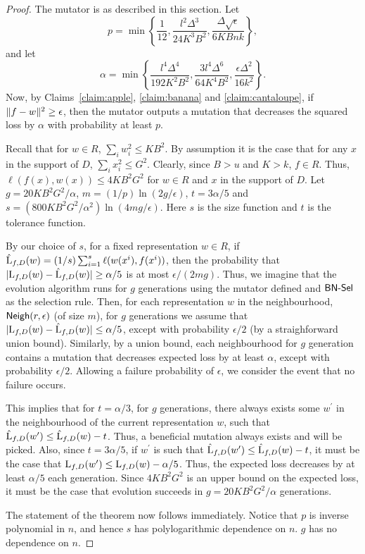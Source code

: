 \begin{proof}
The mutator is as described in this section. Let 
\[ p = \min\left\{\frac{1}{12}, \frac{l^2\Delta^3}{24K^3B^2}, \frac{\Delta
\sqrt{\epsilon}}{6KBnk}\right\},\] 
and let 
\[ \alpha = \min\left\{\frac{l^4 \Delta^4}{192 K^2B^2}, \frac{3 l^4
\Delta^6}{64K^4B^2}, \frac{\epsilon\Delta^2}{16k^2}\right\}.\] 
Now, by Claims~\ref{claim:apple}, \ref{claim:banana} and \ref{claim:cantaloupe},
if $\Vert f - w \Vert^2 \geq \epsilon$, then the mutator outputs a mutation that
decreases the squared loss by $\alpha$ with probability at least $p$.

Recall that for $w \in R$, $\sum_{i} w_i^2 \leq KB^2$. By assumption it is the
case that for any $x$ in the support of $D$, $\sum_{i} x_i^2 \leq G^2$. Clearly,
since $B > u$ and $K > k$, $f \in R$. Thus, $\ell(f(x), w(x)) \leq 4KB^2G^2$ for
$w \in R$ and $x$ in the support of $D$. Let $g = 20 KB^2G^2/\alpha$, $m =
(1/p)\ln(2g/\epsilon)$, $t = 3\alpha/5$  and $s = (800 KB^2G^2/\alpha^2)
\ln(4mg/\epsilon)$. Here $s$ is the size function and $t$ is the tolerance
function.

By our choice of $s$, for a fixed representation $w \in R$, if $\hat{\mathrm{L}}_{f,
D}(w) = (1/s) \sum_{i = 1}^s \ell(w(x^i), f(x^i))$, then the probability that
$|\mathrm{L}_{f, D}(w) - \hat{\mathrm{L}}_{f, D}(w)| \geq \alpha/5$ is at most
$\epsilon/(2mg)$. Thus, we imagine that the evolution algorithm runs for $g$
generations using the mutator defined and $\mathsf{BN\mbox{-}Sel}$ as the selection rule. Then,
for each representation $w$ in the neighbourhood, $\mathsf{Neigh}(r, \epsilon)$ (of size
$m$), for $g$ generations we assume that $|\mathrm{L}_{f, D}(w) - \hat{\mathrm{L}}_{f,
D}(w)| \leq \alpha/5$, except with probability $\epsilon/2$ (by a straighforward
union bound). Similarly, by a union bound, each neighbourhood for $g$ generation
contains a mutation that decreases expected loss by at least $\alpha$, except
with probability $\epsilon/2$. Allowing a failure probability of $\epsilon$, we
consider the event that no failure occurs. 

This implies that for $t = \alpha/3$, for $g$ generations, there always exists
some $w^\prime$ in the neighbourhood of the current representation $w$, such
that $\hat{\mathrm{L}}_{f, D}(w^\prime) \leq \hat{\mathrm{L}}_{f, D}(w) - t$. Thus, a
beneficial mutation always exists and will be picked. Also, since $t = 3
\alpha/5$, if $w^\prime$ is such that $\hat{\mathrm{L}}_{f, D}(w^\prime) \leq
\hat{\mathrm{L}}_{f, D}(w) - t$, it must be the case that $\mathrm{L}_{f, D}(w^\prime) \leq
\mathrm{L}_{f, D}(w) - \alpha/5$. Thus, the expected loss decreases by at least
$\alpha/5$ each generation. Since $4KB^2G^2$ is an upper bound on the expected
loss, it must be the case that evolution succeeds in $g = 20 KB^2G^2/\alpha$
generations.

The statement of the theorem now follows immediately.
Notice that $p$ is inverse polynomial in $n$, and hence $s$ has
polylogarithmic dependence on $n$. $g$ has no dependence on $n$.
\end{proof}

